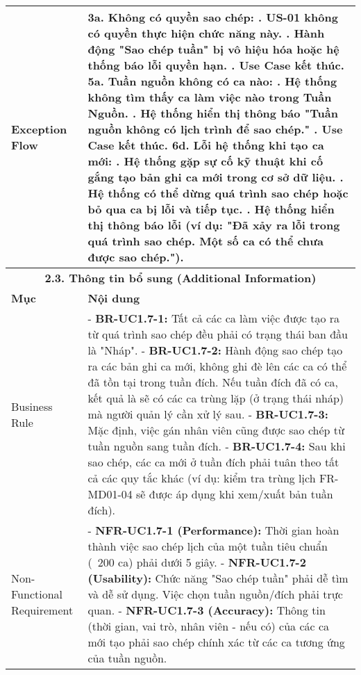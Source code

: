 \begin{longtable}{|m{4cm}|p{11cm}|}
Exception Flow & \textbf{3a. Không có quyền sao chép:} \newline    1. US-01 không có quyền thực hiện chức năng này. \newline    2. Hành động "Sao chép tuần" bị vô hiệu hóa hoặc hệ thống báo lỗi quyền hạn. \newline    3. Use Case kết thúc. \newline \textbf{5a. Tuần nguồn không có ca nào:} \newline    1. Hệ thống không tìm thấy ca làm việc nào trong Tuần Nguồn. \newline    2. Hệ thống hiển thị thông báo "Tuần nguồn không có lịch trình để sao chép." \newline    3. Use Case kết thúc. \newline \textbf{6d. Lỗi hệ thống khi tạo ca mới:} \newline    1. Hệ thống gặp sự cố kỹ thuật khi cố gắng tạo bản ghi ca mới trong cơ sở dữ liệu. \newline    2. Hệ thống có thể dừng quá trình sao chép hoặc bỏ qua ca bị lỗi và tiếp tục. \newline    3. Hệ thống hiển thị thông báo lỗi (ví dụ: "Đã xảy ra lỗi trong quá trình sao chép. Một số ca có thể chưa được sao chép."). \\
\hline
\multicolumn{2}{|c|}{\textbf{2.3. Thông tin bổ sung (Additional Information)}} \\
\hline
\textbf{Mục} & \textbf{Nội dung} \\
\hline
Business Rule & - \textbf{BR-UC1.7-1:} Tất cả các ca làm việc được tạo ra từ quá trình sao chép đều phải có trạng thái ban đầu là "Nháp". \newline - \textbf{BR-UC1.7-2:} Hành động sao chép tạo ra các bản ghi ca mới, không ghi đè lên các ca có thể đã tồn tại trong tuần đích. Nếu tuần đích đã có ca, kết quả là sẽ có các ca trùng lặp (ở trạng thái nháp) mà người quản lý cần xử lý sau. \newline - \textbf{BR-UC1.7-3:} Mặc định, việc gán nhân viên cũng được sao chép từ tuần nguồn sang tuần đích. \newline - \textbf{BR-UC1.7-4:} Sau khi sao chép, các ca mới ở tuần đích phải tuân theo tất cả các quy tắc khác (ví dụ: kiểm tra trùng lịch FR-MD01-04 sẽ được áp dụng khi xem/xuất bản tuần đích). \\
\hline
Non-Functional Requirement & - \textbf{NFR-UC1.7-1 (Performance):} Thời gian hoàn thành việc sao chép lịch của một tuần tiêu chuẩn (~200 ca) phải dưới 5 giây. \newline - \textbf{NFR-UC1.7-2 (Usability):} Chức năng "Sao chép tuần" phải dễ tìm và dễ sử dụng. Việc chọn tuần nguồn/đích phải trực quan. \newline - \textbf{NFR-UC1.7-3 (Accuracy):} Thông tin (thời gian, vai trò, nhân viên - nếu có) của các ca mới tạo phải sao chép chính xác từ các ca tương ứng của tuần nguồn. \\
\hline

\end{longtable}

